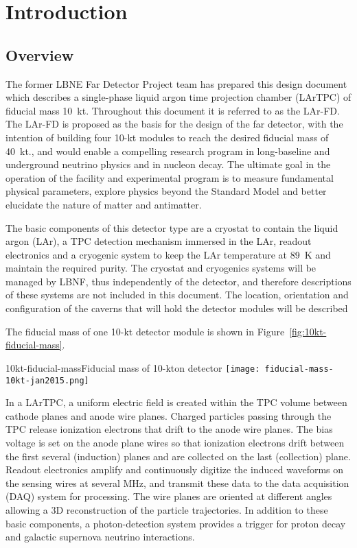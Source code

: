 \chapter{Introduction}

\section{Overview}
The former LBNE Far Detector Project team has prepared this design document which 
describes a single-phase liquid argon time projection chamber (LArTPC) of fiducial mass 10~kt.
Throughout this document it is referred to as the LAr-FD. 
The LAr-FD is proposed as the basis for the design of the \expshort far detector, with 
the intention of building four 10-kt modules to reach the desired fiducial mass of 40~kt., and 
would enable a compelling research program in long-baseline and underground
neutrino physics and in nucleon decay. The ultimate goal in
the operation of the facility and experimental program is to measure fundamental physical
parameters, explore physics beyond the Standard Model and better elucidate the nature of matter
and antimatter. 

The basic components of this detector type are a cryostat to contain the liquid argon (LAr), 
a TPC detection mechanism immersed in the LAr, readout electronics and
a cryogenic system to keep the LAr temperature at 89~K and maintain the required purity. 
The cryostat and cryogenics systems will be managed by LBNF, thus independently of the detector, 
and therefore descriptions of these systems are not included in this document. The location, orientation and
 configuration of the caverns that will hold the detector modules will be described 


The fiducial mass of one 10-kt detector module is shown in Figure~\ref{fig:10kt-fiducial-mass}.

\begin{cdrfigure}{10kt-fiducial-mass}{Fiducial mass of 10-kton detector}
 \texttt{[image: fiducial-mass-10kt-jan2015.png]}
 \end{cdrfigure}

In a LArTPC, a uniform electric field is created within the TPC
volume between cathode planes and anode wire planes. Charged particles
passing through the TPC release ionization electrons that drift to the
anode wire planes. The bias voltage is set on the anode plane wires so that ionization electrons drift between the first several (induction) planes and are collected on the last (collection) plane.
Readout electronics amplify and continuously digitize
the induced waveforms on the sensing wires at several MHz, and transmit
these data to the data acquisition (DAQ)  system for processing. The wire planes are oriented at different angles allowing a 3D reconstruction of the particle trajectories. In addition to these basic
components, a photon-detection system provides a trigger for proton
decay and galactic supernova neutrino interactions. 



